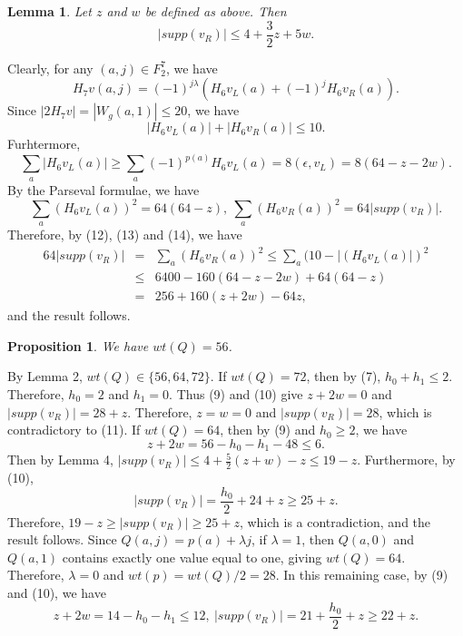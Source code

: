 \documentclass[11pt]{article}
\newtheorem{lemma}{Lemma}
\newtheorem{proposition}{Proposition}
\newtheorem{open problem}{Open problem}
\begin{document}
\begin{lemma} Let $z$ and $w$ be defined as above. Then
\begin{equation}
|supp(v_R)|\le 4+\frac{3}{2}z+5w.
\end{equation}
\end{lemma}
\proof Clearly, for any $(a,j)\in F_2^7$, we have
\[
H_7v(a,j)=(-1)^{j\lambda}(H_6v_L(a)+(-1)^jH_6v_R(a)).
\]
Since $|2H_7v|=|W_g(a,1)|\le 20$, we have
\begin{equation}
|H_6v_L(a)|+|H_6v_R(a)|\le 10.
\end{equation}
Furhtermore,
\begin{equation}
\sum_a|H_6v_L(a)|\ge \sum_a(-1)^{p(a)}H_6v_L(a)=8(\epsilon,v_L)=8(64-z-2w).
\end{equation}
By the Parseval formulae, we have
\begin{equation}
\sum_a(H_6v_L(a))^2=64(64-z), \  \sum_a(H_6v_R(a))^2=64|supp(v_R)|.
\end{equation}
Therefore, by (12), (13) and (14), we have
\begin{eqnarray*}
64|supp(v_R)|&=&\sum_a(H_6v_R(a))^2\le\sum_a(10-|(H_6v_L(a)|)^2\\
&\le& 6400-160(64-z-2w)+64(64-z)\\
&=& 256+160(z+2w)-64z,
\end{eqnarray*}
and the result follows.
\endproof

\begin{proposition} We have $wt(Q)=56$.
\end{proposition}
\proof By Lemma 2,  $wt(Q)\in \{56,64,72\}$. If $wt(Q)=72$, then by (7), $h_0+h_1\le 2$. Therefore, $h_0=2$ and $h_1=0$. Thus (9) and (10) give $z+2w=0$ and $|supp(v_R)|=28+z$. Therefore, $z=w=0$ and $|supp(v_R)|=28$, which is contradictory to (11). If $wt(Q)=64$, then by (9) and $h_0\ge 2$, we have
\[
z+2w=56-h_0-h_1-48\le 6.
\]
Then by Lemma 4, $|supp(v_R)|\le 4+\frac{5}{2}(z+w)-z\le 19-z$. Furthermore, by (10),
\[
|supp(v_R)|=\frac{h_0}{2}+24+z\ge 25+z.
\]
 Therefore, $19-z\ge |supp(v_R)|\ge 25+z$, which is a contradiction, and the result follows.
\endproof
Since $Q(a,j)=p(a)+\lambda j$, if $\lambda=1$, then $Q(a,0)$ and $Q(a,1)$ contains exactly one value equal to one, giving $wt(Q)=64$. Therefore, $\lambda=0$ and $wt(p)=wt(Q)/2=28$. In this remaining case, by (9) and (10), we have
\begin{equation}
z+2w=14-h_0-h_1\le 12, \ |supp(v_R)|=21+\frac{h_0}{2}+z\ge 22+z.
\end{equation}
\end{document}
